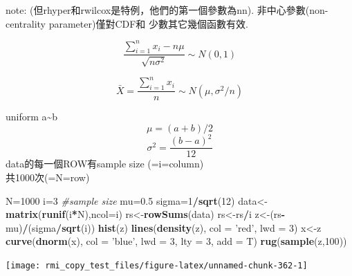 \documentclass[]{book}
\newenvironment{Shaded}{\begin{snugshade}}{\end{snugshade}}
\newcommand{\CommentTok}[1]{\textcolor[rgb]{0.56,0.35,0.01}{\textit{#1}}}
\newcommand{\DataTypeTok}[1]{\textcolor[rgb]{0.13,0.29,0.53}{#1}}
\newcommand{\DecValTok}[1]{\textcolor[rgb]{0.00,0.00,0.81}{#1}}
\newcommand{\FloatTok}[1]{\textcolor[rgb]{0.00,0.00,0.81}{#1}}
\newcommand{\KeywordTok}[1]{\textcolor[rgb]{0.13,0.29,0.53}{\textbf{#1}}}
\newcommand{\NormalTok}[1]{#1}
\newcommand{\OperatorTok}[1]{\textcolor[rgb]{0.81,0.36,0.00}{\textbf{#1}}}
\newcommand{\StringTok}[1]{\textcolor[rgb]{0.31,0.60,0.02}{#1}}
\theoremstyle{definition}
\theoremstyle{definition}
\theoremstyle{definition}
\theoremstyle{remark}
\begin{document}
note: (但rhyper和rwilcox是特例，他們的第一個參數為nn).
非中心參數(non-centrality parameter)僅對CDF和 少數其它幾個函數有效.

\[ \frac{{\sum\limits_{i = 1}^n {{x_i} - n\mu } }}{{\sqrt {n{\sigma ^2}} }} \sim  N(0,1) \]

\[ \bar X = \frac{{\sum_{i = 1}^n {{x_i} } }}{n} \sim  N(\mu, \sigma^2/n) \]

uniform a\textasciitilde{}b \[\mu = (a+b)/2\]
\[\sigma^2=\frac{(b-a)^2}{12} \] data的每一個ROW有sample size
(=i=column)\\
共1000次(=N=row)

\begin{Shaded}
\begin{Highlighting}[]
\NormalTok{N=}\DecValTok{1000} 
\NormalTok{i=}\DecValTok{3} \CommentTok{#sample size}
\NormalTok{mu=}\FloatTok{0.5}
\NormalTok{sigma=}\DecValTok{1}\OperatorTok{/}\KeywordTok{sqrt}\NormalTok{(}\DecValTok{12}\NormalTok{)}
\NormalTok{data<-}\KeywordTok{matrix}\NormalTok{(}\KeywordTok{runif}\NormalTok{(i}\OperatorTok{*}\NormalTok{N),}\DataTypeTok{ncol=}\NormalTok{i)}
\NormalTok{rs<-}\KeywordTok{rowSums}\NormalTok{(data)}
\NormalTok{rs<-rs}\OperatorTok{/}\NormalTok{i}
\NormalTok{z<-(rs}\OperatorTok{-}\NormalTok{mu)}\OperatorTok{/}\NormalTok{(sigma}\OperatorTok{/}\KeywordTok{sqrt}\NormalTok{(i))}
\KeywordTok{hist}\NormalTok{(z)}
\KeywordTok{lines}\NormalTok{(}\KeywordTok{density}\NormalTok{(z), }\DataTypeTok{col =} \StringTok{'red'}\NormalTok{, }\DataTypeTok{lwd =} \DecValTok{3}\NormalTok{)}
\NormalTok{x<-z}
\KeywordTok{curve}\NormalTok{(}\KeywordTok{dnorm}\NormalTok{(x), }\DataTypeTok{col =} \StringTok{'blue'}\NormalTok{, }\DataTypeTok{lwd =} \DecValTok{3}\NormalTok{, }\DataTypeTok{lty =} \DecValTok{3}\NormalTok{, }\DataTypeTok{add =}\NormalTok{ T)}
\KeywordTok{rug}\NormalTok{(}\KeywordTok{sample}\NormalTok{(z,}\DecValTok{100}\NormalTok{))}
\end{Highlighting}
\end{Shaded}

\begin{center}\texttt{[image: rmi\_copy\_test\_files/figure-latex/unnamed-chunk-362-1]} \end{center}
\end{document}

